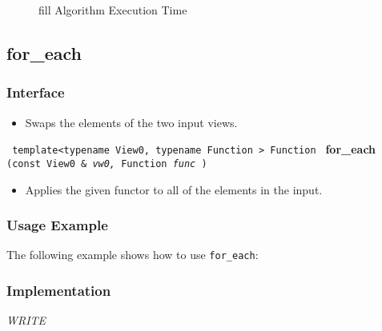 \begin{figure}[p]
\caption{fill Algorithm Execution Time}
\label{fig:fill-alg-exec-exper}
\end{figure}


\subsection{for\_each} \label{sec-muta-foreach}

\subsubsection{Interface} %

\begin{itemize}
\item
Swaps the elements of the two input views. 
\end{itemize}
 
\noindent
\texttt{%
template<typename View0, typename Function >
\newline
Function 
}
\newline
\textbf{for\_each}%
\texttt{%
(const View0 \&
\textit{vw0,}%
Function 
\textit{func}%
)
}

\begin{itemize}
\item
Applies the given functor to all of the elements in the input. 
\end{itemize}
 
\subsubsection{Usage Example} %

The following example shows how to use \texttt{for\_each}:

 
\subsubsection{Implementation} %

\textit{WRITE}

